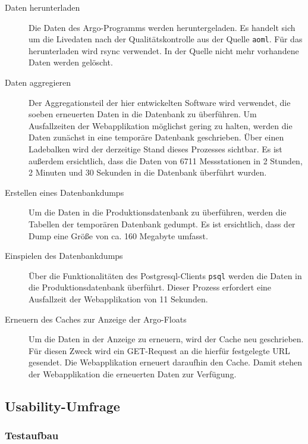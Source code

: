 \begin{description}
 \item [Daten herunterladen]
    Die Daten des Argo-Programms werden heruntergeladen. Es handelt sich um die Livedaten nach der Qualitätskontrolle aus der Quelle \texttt{aoml}. Für das herunterladen wird rsync verwendet. In der Quelle nicht mehr vorhandene Daten werden gelöscht.


 \item [Daten aggregieren]
    Der Aggregationsteil der hier entwickelten Software wird verwendet, die soeben erneuerten Daten in die Datenbank zu überführen. Um Ausfallzeiten der Webapplikation möglichst gering zu halten, werden die Daten zunächst in eine temporäre Datenbank geschrieben. Über einen Ladebalken wird der derzeitige Stand dieses Prozesses sichtbar. Es ist außerdem ersichtlich, dass die Daten von 6711 Messstationen in 2 Stunden, 2 Minuten und 30 Sekunden in die Datenbank überführt wurden.

 \item [Erstellen eines Datenbankdumps]
    Um die Daten in die Produktionsdatenbank zu überführen, werden die Tabellen der temporären Datenbank gedumpt. Es ist ersichtlich, dass der Dump eine Größe von  ca. 160 Megabyte umfasst.

 \item [Einspielen des Datenbankdumps]
    Über die Funktionalitäten des Postgresql-Clients \newline\texttt{psql} werden die Daten in die Produktionsdatenbank überführt. Dieser Prozess erfordert eine Ausfallzeit der Webapplikation von 11 Sekunden.

 \item [Erneuern des Caches zur Anzeige der Argo-Floats]
    Um die Daten in der Anzeige zu erneuern, wird der Cache neu geschrieben. Für diesen Zweck wird ein GET-Request an die hierfür festgelegte URL gesendet. Die Webapplikation erneuert daraufhin den Cache. Damit stehen der Webapplikation die erneuerten  Daten zur Verfügung.
\end{description}



\newpage
\subsection{Usability-Umfrage}

\subsubsection{Testaufbau}

